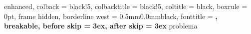 \usepackage{titlesec}
\usepackage[many]{tcolorbox}

\titlespacing*{\chapter}{0cm}{-2.0cm}{0.50cm}
\titlespacing*{\section}{0cm}{0.50cm}{0.25cm}

\setlength{\parindent}{0pt}
\setlength{\parskip}{1ex}


%
    {enhanced,
    colback = black!5, %
    colbacktitle = black!5,
    coltitle = black,
    boxrule = 0pt,
    frame hidden,
    borderline west = {0.5mm}{0.0mm}{black},
    fonttitle = \bfseries\sffamily,
    breakable,
    before skip = 3ex,
    after skip = 3ex
}{problema}



